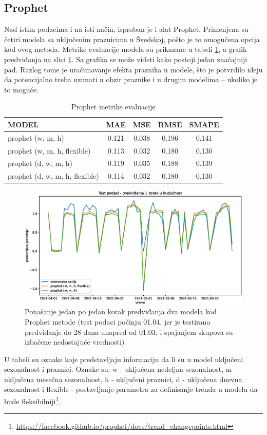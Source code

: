 \documentclass[12pt,oneside]{memoir}
\begin{document}
\subsection{Prophet}
Nad istim podacima i na isti način, isproban je i alat Prophet. Primenjena su četiri modela sa uključenim praznicima u Švedskoj, pošto je to omogućena opcija kod ovog metoda. Metrike evaluacije modela su prikazane u tabeli \ref{tbl: prophet_dnevni}, a grafik predviđanja na slici \ref{fig: test_prophet}. Sa grafika se može videti kako postoji jedan značajniji pad. Razlog tome je uračunavanje efekta praznika u modele, što je potvrdilo ideju da potencijalno treba uzimati u obzir praznike i u drugim modelima -- ukoliko je to moguće.
\begin{table}
\centering
\caption{Prophet metrike evaluacije}
\label{tbl: prophet_dnevni}
\begin{tabular}{ |l|c|c|c|c|} 
\hline
MODEL & MAE & MSE & RMSE & SMAPE \\
\hline
prophet (w, m, h) & 0.121 & 0.038 & 0.196 & 0.141 \\ 
prophet (w, m, h, flexible) & 0.113 & 0.032 & 0.180 & 0.130\\
prophet (d, w, m, h) & 0.119 & 0.035 & 0.188 & 0.139 \\
prophet (d, w, m, h, flexible) & 0.114 & 0.032 & 0.180 & 0.130\\
\hline
\end{tabular}
\end{table}

\begin{figure}[!ht]
  \centering
  \includegraphics[width=1\textwidth]{./grafici/test_dnevni_prophet.eps}
  \caption{Ponašanje jedan po jedan korak predviđanja dva modela kod Prophet metode (test podaci počinju 01.04, jer je testirano predviđanje do 28 dana unapred od 01.03. i spajanjem skupova su izbačene nedostajuće vrednosti)}
  \label{fig: test_prophet}
\end{figure}
U tabeli su oznake koje predstavljaju informaciju da li su u model uključeni sezonalnost i praznici. Oznake su: w - uključena nedeljna sezonalnost, m - uključena mesečna sezonalnost, h - uključeni praznici, d - uključena dnevna sezonalnost i flexible - postavljanje parametra za definisanje trenda u modelu da bude fleksibilniji\footnote{\url{https://facebook.github.io/prophet/docs/trend_changepoints.html}}. 
\end{document}
